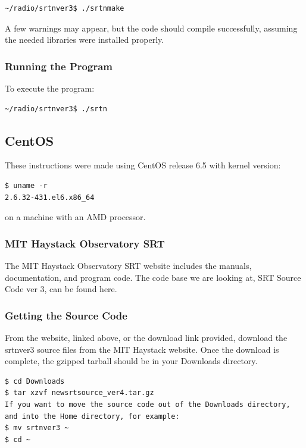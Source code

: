 \documentclass[11pt]{article} %
\begin{document}
\begin{verbatim}
~/radio/srtnver3$ ./srtnmake
\end{verbatim}

A few warnings may appear, but the code should compile successfully, assuming the needed libraries were installed properly.

\subsubsection{Running the Program}
To execute the program:
 
\begin{verbatim}
~/radio/srtnver3$ ./srtn
\end{verbatim}



\subsection{CentOS}


These instructions were made using CentOS release 6.5 with kernel version:

\begin{verbatim}
$ uname -r
2.6.32-431.el6.x86_64
\end{verbatim}
on a machine with an AMD processor.

\subsubsection{MIT Haystack Observatory SRT}
The MIT Haystack Observatory SRT website includes the manuals, documentation, and program code. The code base we are looking at, SRT Source Code ver 3, can be found here.

\subsubsection{Getting the Source Code}
From the website, linked above, or the download link provided, download the srtnver3 source files from the MIT Haystack website. Once the download is complete, the gzipped tarball should be in your Downloads directory.

\begin{verbatim}
$ cd Downloads
$ tar xzvf newsrtsource_ver4.tar.gz
If you want to move the source code out of the Downloads directory, and into the Home directory, for example:
$ mv srtnver3 ~
$ cd ~
\end{verbatim}
\end{document}

